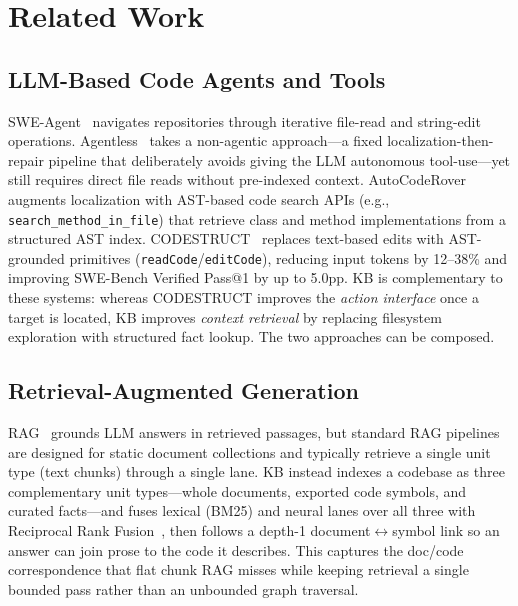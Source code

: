 \section{Related Work}
\label{sec:related}

\subsection{LLM-Based Code Agents and Tools}

SWE-Agent~\cite{yang2024sweagent} navigates repositories through iterative
file-read and string-edit operations.  Agentless~\cite{xia2024agentless} takes
a non-agentic approach—a fixed localization-then-repair pipeline that
deliberately avoids giving the LLM autonomous tool-use—yet still requires
direct file reads without pre-indexed context.
AutoCodeRover~\cite{zhang2024autocoderover}
augments localization with AST-based code search APIs (e.g.,
\texttt{search\_method\_in\_file}) that retrieve class and method implementations
from a structured AST index.
CODESTRUCT~\cite{kim2025codestruct} replaces text-based edits with AST-grounded
primitives (\texttt{readCode}/\texttt{editCode}), reducing input tokens by
12--38\% and improving SWE-Bench Verified Pass@1 by up to 5.0pp.  KB is
complementary to these systems: whereas CODESTRUCT improves the \emph{action
interface} once a target is located, KB improves \emph{context retrieval} by
replacing filesystem exploration with structured fact lookup.  The two
approaches can be composed.

\subsection{Retrieval-Augmented Generation}

RAG~\cite{lewis2020rag} grounds LLM answers in retrieved passages, but standard
RAG pipelines are designed for static document collections and typically retrieve
a single unit type (text chunks) through a single lane.  KB instead indexes a
codebase as three complementary unit types---whole documents, exported code
symbols, and curated facts---and fuses lexical (BM25) and neural lanes over all
three with Reciprocal Rank Fusion~\cite{cormack2009rrf}, then follows a depth-1
document$\leftrightarrow$symbol link so an answer can join prose to the code it
describes.  This captures the doc/code correspondence that flat chunk RAG misses
while keeping retrieval a single bounded pass rather than an unbounded graph
traversal.

